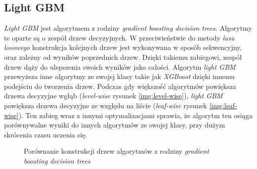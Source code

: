 \documentclass[a4paper, twoside, 11pt, openright]{article}
\begin{document}
\subsection{Light GBM \cite{lgbm}}

\textit{Light GBM} jest algorytmem z rodziny \textit{gradient boosting decision trees}. Algorytmy te oparte są o zespół drzew decyzyjnych. W przeciwieństwie do metody \textit{lasu losowego} konstrukcja kolejnych drzew jest wykonywana w sposób sekwencyjny, oraz zależny od wyników poprzednich drzew. Dzięki takiemu zabiegowi, zespół drzew dąży do ulepszenia swoich wyników jako całości. Algorytm \textit{light GBM} przewyższa inne algorytmy ze swojej klasy takie jak \textit{XGBoost} dzięki innemu podejściu do tworzenia drzew. Podczas gdy większość algorytmów powiększa drzewa decyzyjne wgłąb (\textit{level-wise}  rysunek \ref{img:level-wise}), \textit{light GBM} powiększa drzewa decyzyjne ze względu na liście (\textit{leaf-wise} rysunek \ref{img:leaf-wise}). Ten zabieg wraz z innymi optymalizacjami sprawia, że algorytm ten osiąga porównywalne wyniki do innych algorytmów ze swojej klasy, przy dużym skrócenia czasu uczenia się. 


\begin{figure}[H]%
\centering
{}%
\qquad
{}%
\caption{Porównanie konstrukcji drzew algorytmów z rodziny \textit{gradient boosting decision trees}}
\label{img:level-leaf-wise}
\end{figure}
\end{document}

